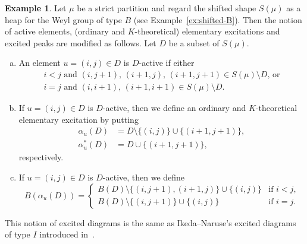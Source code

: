 \documentclass[10pt]{amsart}
\theoremstyle{definition}
\newtheorem{exam}[theo]{Example}
\theoremstyle{remark}
\begin{document}
\begin{exam}
\label{ex:shited-B-excited}
Let $\mu$ be a strict partition and regard the shifted shape $S(\mu)$ as a heap for the Weyl group of type $B$ 
(see Example~\ref{ex:shifted-B}).
Then the notion of active elements, (ordinary and $K$-theoretical) elementary excitations and excited peaks 
are modified as follows.
Let $D$ be a subset of $S(\mu)$.
\begin{enumerate}[(a)]
\item\label{exam3.19_a} %
An element $u = (i,j) \in D$ is $D$-active if either
\begin{gather*}
\text{$i < j$ and $(i,j+1)$, $(i+1,j)$, $(i+1,j+1) \in S(\mu) \setminus D$, or}
\\
\text{$i = j$ and $(i,i+1)$, $(i+1,i+1) \in S(\mu) \setminus D$.}
\end{gather*}
\item\label{exam3.19_b} %
If $u = (i,j) \in D$ is $D$-active, then we define an ordinary and $K$-theoretical 
elementary excitation by putting
\begin{align*}
\alpha_u(D) &= D \setminus \{ (i,j) \} \cup \{ (i+1,j+1) \},
\\
\alpha^*_u(D) &= D \cup \{ (i+1,j+1) \},
\end{align*}
respectively.
\item\label{exam3.19_c} %
If $u = (i,j) \in D$ is $D$-active, then we define
$$
B(\alpha_u(D))
 =
\begin{cases}
 B(D) \setminus \{ (i,j+1), (i+1,j) \} \cup \{ (i,j) \} 
 &\text{if $i<j$,}
\\
 B(D) \setminus \{ (i,j+1) \} \cup \{ (i,j) \} 
 &\text{if $i=j$.}
\end{cases}
$$
\end{enumerate}
This notion of excited diagrams is the same as Ikeda--Naruse's excited diagrams of type $I$ 
introduced in~\cite{IN1}.


\end{exam}
\end{document}
